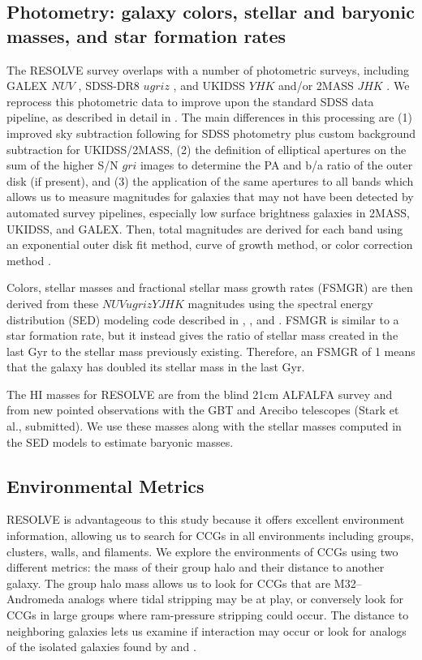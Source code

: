 \documentclass[iop,apj]{emulateapj}
\begin{document}
\subsection{Photometry: galaxy colors, stellar and baryonic masses, and star formation rates}
\label{phot}
\noindent The RESOLVE survey overlaps with a number of photometric surveys, including GALEX $NUV$ \citep{Morrissey2007}, SDSS-DR8 $ugriz$ \citep{Aihara2011}, and UKIDSS $YHK$ and/or 2MASS $JHK$ \citep{Skrutskie2006}. We reprocess this photometric data to improve upon the standard SDSS data pipeline, as described in detail in \citet{Eckert2015}. The main differences in this processing are (1) improved sky subtraction following \citet{Blanton2011} for SDSS photometry plus custom background subtraction for UKIDSS/2MASS, (2) the definition of elliptical apertures on the sum of the higher S/N $gri$ images to determine the PA and b/a ratio of the outer disk (if present), and (3) the application of the same apertures to all bands which allows us to measure magnitudes for galaxies that may not have been detected by automated survey pipelines, especially low surface brightness galaxies in 2MASS, UKIDSS, and GALEX. Then, total magnitudes are derived for each band using an exponential outer disk fit method, curve of growth method, or color correction method \citep[e.g., Figure 2 in][]{Eckert2015}. 

Colors, stellar masses and fractional stellar mass growth rates (FSMGR) are then derived from these $NUVugrizYJHK$ magnitudes using the spectral energy distribution (SED) modeling code described in \citet{Kannappan2007}, \citet{Kannappan2009}, and \citet{Kannappan2013}. FSMGR is similar to a star formation rate, but it instead gives the ratio of stellar mass created in the last Gyr to the stellar mass previously existing. Therefore, an FSMGR of 1 means that the galaxy has doubled its stellar mass in the last Gyr.

The HI masses for RESOLVE are from the blind 21cm ALFALFA survey \citep{Haynes2011} and from new pointed observations with the GBT and Arecibo telescopes (Stark et al., submitted). We use these masses along with the stellar masses computed in the SED models to estimate baryonic masses.

\subsection{Environmental Metrics}
\label{env}
\noindent RESOLVE is advantageous to this study because it offers excellent environment information, allowing us to search for CCGs in all environments including groups, clusters, walls, and filaments. We explore the environments of CCGs using two different metrics: the mass of their group halo and their distance to another galaxy. The group halo mass allows us to look for CCGs that are M32--Andromeda analogs where tidal stripping may be at play, or conversely look for CCGs in large groups where ram-pressure stripping could occur. The distance to neighboring galaxies lets us examine if interaction may occur or look for analogs of the isolated galaxies found by \citet{Huxor2013} and \citet{Paudel2014}.
\end{document}

